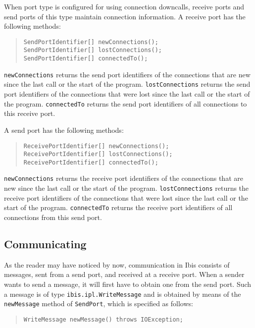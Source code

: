 \documentclass[10pt]{article}
\newcommand{\mysubsection}[1]{\subsection{#1}\label{#1}}
\begin{document}
When port type is configured for using connection downcalls, receive ports
and send ports of this type maintain connection information.
A receive port has the following methods:

\begin{quote}
\begin{verbatim}
SendPortIdentifier[] newConnections();
SendPortIdentifier[] lostConnections();
SendPortIdentifier[] connectedTo();
\end{verbatim}
\end{quote}

\verb+newConnections+ returns the send port identifiers of the connections
that are new since the last call or the start of the program.
\verb+lostConnections+ returns the send port identifiers of the connections
that were lost since the last call or the start of the program.
\verb+connectedTo+ returns the send port identifiers of all connections
to this receive port.

A send port has the following methods:

\begin{quote}
\begin{verbatim}
ReceivePortIdentifier[] newConnections();
ReceivePortIdentifier[] lostConnections();
ReceivePortIdentifier[] connectedTo();
\end{verbatim}
\end{quote}

\verb+newConnections+ returns the receive port identifiers of the connections
that are new since the last call or the start of the program.
\verb+lostConnections+ returns the receive port identifiers of the connections
that were lost since the last call or the start of the program.
\verb+connectedTo+ returns the receive port identifiers of all connections
from this send port.

\mysubsection{Communicating}

As the reader may have noticed by now, communication in Ibis
consists of messages, sent from a send port, and received at a
receive port. When a sender wants to send a message, it will first
have to obtain one from the send port. Such a message is of
type \verb+ibis.ipl.WriteMessage+ and is obtained by means of
the \verb+newMessage+ method of \verb+SendPort+, which is specified
as follows:

\begin{quote}
\begin{verbatim}
WriteMessage newMessage() throws IOException;
\end{verbatim}
\end{quote}
\end{document}
